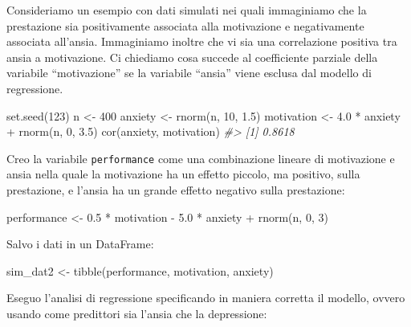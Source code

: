 \documentclass[
  11pt,
]{krantz}
\makeatletter
\newenvironment{Shaded}{\begin{snugshade}}{\end{snugshade}}
\newcommand{\CommentTok}[1]{\textcolor[rgb]{0.37,0.37,0.37}{\textit{#1}}}
\newcommand{\DecValTok}[1]{\textcolor[rgb]{0.06,0.06,0.06}{#1}}
\newcommand{\FloatTok}[1]{\textcolor[rgb]{0.06,0.06,0.06}{#1}}
\newcommand{\FunctionTok}[1]{\textcolor[rgb]{0,0,0}{#1}}
\newcommand{\NormalTok}[1]{#1}
\newcommand{\OtherTok}[1]{\textcolor[rgb]{0.37,0.37,0.37}{#1}}
\newcommand{\SpecialCharTok}[1]{\textcolor[rgb]{0,0,0}{#1}}
\newenvironment{kframe}{%
\medskip{}
\setlength{\fboxsep}{.8em}
 \def\at@end@of@kframe{}%
 \ifinner\ifhmode%
  \def\at@end@of@kframe{\end{minipage}}%
  \begin{minipage}{\columnwidth}%
 \fi\fi%
 \def\FrameCommand##1{\hskip\@totalleftmargin \hskip-\fboxsep
 \colorbox{shadecolor}{##1}\hskip-\fboxsep
     \hskip-\linewidth \hskip-\@totalleftmargin \hskip\columnwidth}%
 \MakeFramed {\advance\hsize-\width
   \@totalleftmargin\z@ \linewidth\hsize
   \@setminipage}}%
 {\par\unskip\endMakeFramed%
 \at@end@of@kframe}
\renewenvironment{Shaded}{\begin{kframe}}{\end{kframe}}
\theoremstyle{definition}
\theoremstyle{definition}
\theoremstyle{definition}
\theoremstyle{definition}
\theoremstyle{remark}
\makeatother
\begin{document}
Consideriamo un esempio con dati simulati nei quali immaginiamo che la prestazione sia positivamente associata alla motivazione e negativamente associata all'ansia. Immaginiamo inoltre che vi sia una correlazione positiva tra ansia a motivazione. Ci chiediamo cosa succede al coefficiente parziale della variabile ``motivazione'' se la variabile ``ansia'' viene esclusa dal modello di regressione.

\begin{Shaded}
\begin{Highlighting}[]
\FunctionTok{set.seed}\NormalTok{(}\DecValTok{123}\NormalTok{)}
\NormalTok{n }\OtherTok{\textless{}{-}} \DecValTok{400}
\NormalTok{anxiety }\OtherTok{\textless{}{-}} \FunctionTok{rnorm}\NormalTok{(n, }\DecValTok{10}\NormalTok{, }\FloatTok{1.5}\NormalTok{)}
\NormalTok{motivation }\OtherTok{\textless{}{-}} \FloatTok{4.0} \SpecialCharTok{*}\NormalTok{ anxiety }\SpecialCharTok{+} \FunctionTok{rnorm}\NormalTok{(n, }\DecValTok{0}\NormalTok{, }\FloatTok{3.5}\NormalTok{)}
\FunctionTok{cor}\NormalTok{(anxiety, motivation)}
\CommentTok{\#\textgreater{} [1] 0.8618}
\end{Highlighting}
\end{Shaded}

Creo la variabile \texttt{performance} come una combinazione lineare di motivazione e ansia nella quale la motivazione ha un effetto piccolo, ma positivo, sulla prestazione, e l'ansia ha un grande effetto negativo sulla prestazione:

\begin{Shaded}
\begin{Highlighting}[]
\NormalTok{performance }\OtherTok{\textless{}{-}} \FloatTok{0.5} \SpecialCharTok{*}\NormalTok{ motivation }\SpecialCharTok{{-}} \FloatTok{5.0} \SpecialCharTok{*}\NormalTok{ anxiety }\SpecialCharTok{+} \FunctionTok{rnorm}\NormalTok{(n, }\DecValTok{0}\NormalTok{, }\DecValTok{3}\NormalTok{)}
\end{Highlighting}
\end{Shaded}

Salvo i dati in un DataFrame:

\begin{Shaded}
\begin{Highlighting}[]
\NormalTok{sim\_dat2 }\OtherTok{\textless{}{-}} \FunctionTok{tibble}\NormalTok{(performance, motivation, anxiety)}
\end{Highlighting}
\end{Shaded}

Eseguo l'analisi di regressione specificando in maniera corretta il modello, ovvero usando come predittori sia l'ansia che la depressione:
\end{document}
